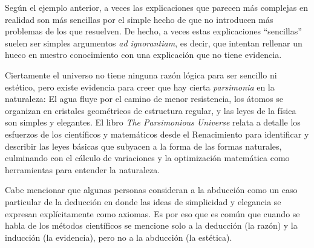 Según el ejemplo anterior, a veces las explicaciones que parecen más complejas
en realidad son más sencillas por el simple hecho de que no introducen más
problemas de los que resuelven.
De hecho, a veces estas explicaciones “sencillas” suelen ser simples argumentos
\emph{ad ignorantiam}, es decir, que intentan rellenar un hueco en nuestro
conocimiento con una explicación que no tiene evidencia.

Ciertamente el universo no tiene ninguna razón lógica para ser sencillo ni
estético, pero existe evidencia para creer que hay cierta \emph{parsimonia} en
la naturaleza:
El agua fluye por el camino de menor resistencia, los átomos se organizan en
cristales geométricos de estructura regular, y las leyes de la física son
simples y elegantes.
El libro \emph{The Parsimonious Universe}\cite{Hildebrandt2012} relata a detalle
los esfuerzos de los científicos y matemáticos desde el Renacimiento para
identificar y describir las leyes básicas que subyacen a la forma de las formas
naturales, culminando con el cálculo de variaciones y la optimización matemática
como herramientas para entender la naturaleza.

Cabe mencionar que algunas personas consideran a la abducción como un caso
particular de la deducción en donde las ideas de simplicidad y elegancia se
expresan explícitamente como axiomas.
Es por eso que es común que cuando se habla de los métodos científicos se
mencione solo a la deducción (la razón) y la inducción (la evidencia), pero no
a la abducción (la estética).

